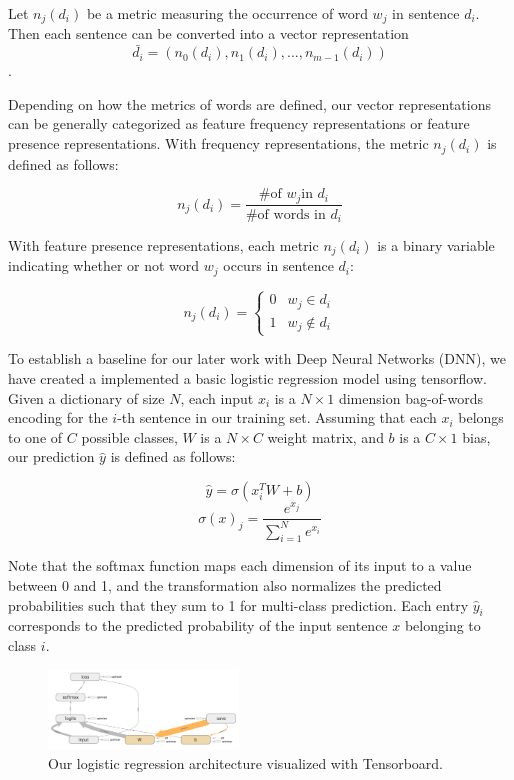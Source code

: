 \documentclass[conference]{IEEEtran}
\begin{document}
    Let $n_j(d_i)$ be a metric measuring the occurrence of word $w_j$
    in sentence $d_i$. Then each sentence can be converted into a vector representation 
    $$\bar{d_i}=(n_0(d_i),n_1(d_i),\ldots,n_{m-1}(d_i))$$.
    
    Depending on how the metrics of words are defined, our vector representations can be
    generally categorized as feature frequency representations or feature presence
    representations\cite{pang2002thumbs}. With frequency representations, the metric 
    $n_j(d_i)$ is defined as follows: 
     
    $$n_j(d_i) = \frac{\text{\# of }w_j \text{in } d_i}{\text{\# of words in } d_i}$$

    With feature presence representations, each metric $n_j(d_i)$ is a binary
    variable indicating whether or not word $w_j$ occurs in sentence $d_i$:
     
    $$n_j(d_i) = \begin{cases} 
        0 & w_j \in d_i\\
        1 & w_j \notin d_i
    \end{cases}$$
    
    To establish a baseline for our later work with Deep Neural Networks (DNN), we have
    created a implemented a basic logistic regression model using tensorflow. Given a 
    dictionary of size $N$, each input $x_i$ is a $N \times 1$ dimension bag-of-words encoding
    for the $i$-th sentence in our training set. Assuming that each $x_i$ belongs to one of $C$
    possible classes, $W$ is a $N \times C$ weight matrix, and $b$ is a $C \times 1$ bias,
    our prediction $\hat{y}$ is defined as follows:
        
    $$\hat{y} = \sigma(x^T_i W +b)$$
    $$\sigma (x)_{j}={\frac {e^{x_{j}}}{\sum _{i=1}^{N}e^{x_{i}}}}$$
    
    Note that the softmax function maps each dimension of its input to a value between 0 and 1, and the
    transformation also normalizes the predicted probabilities such that they sum to 1
    for multi-class prediction. Each entry $\hat{y}_i$ corresponds to the predicted
    probability of the input sentence $x$ belonging to class $i$.
    \begin{figure}[]
        \includegraphics[width=0.45\textwidth]{figure/model_architecture}
        \caption{Our logistic regression architecture visualized with Tensorboard.}
    \end{figure}
    
\end{document}
